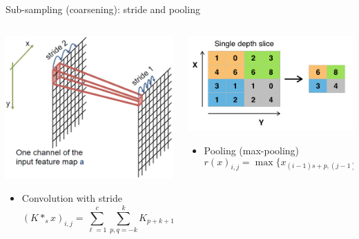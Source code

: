 \documentclass{beamer}
\begin{document}
\begin{CJK*}{UTF8}{gbsn}
\begin{frame}{Sub-sampling (coarsening): stride and pooling}
\begin{columns}
\begin{column}{0.5\textwidth}
\begin{center}
\includegraphics[width=.6\textwidth, height=0.4\textheight]{figures/PoolingLayer1} 
\end{center}
\begin{itemize}
\item Convolution with stride
{\tiny
$$(K\ast_{s} x)_{i,j} = \sum_{\ell=1}^c\sum_{p, q = -k}^k K_{p+k+1,q+k+1}x_{is + p, js + q} .$$
}
\end{itemize}
\end{column}
\begin{column}{0.5\textwidth}	
\begin{center}
\includegraphics[width=.6\textwidth, height=0.4\textheight]{figures/PoolingLayer2}
\end{center}	
\begin{itemize}
\item Pooling (max-pooling)
{\tiny
$$r(x)_{i,j} = \max\{x_{(i-1)s + p,(j-1)s + q} ~:~ p,q = 1:s\}.$$
}
\end{itemize}
\end{column}
\end{columns}
\end{frame}



\end{CJK*}
\end{document}
